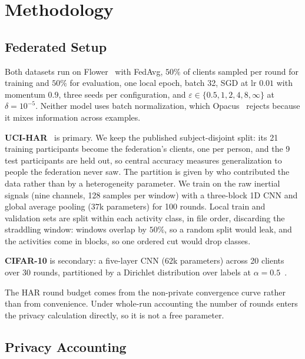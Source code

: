 \section{Methodology}

\subsection{Federated Setup}

Both datasets run on Flower~\cite{beutel2020flower} with FedAvg, $50\%$ of clients
sampled per round for training and $50\%$ for evaluation, one local epoch,
batch 32, SGD at lr $0.01$ with momentum $0.9$, three seeds per
configuration, and $\varepsilon \in \{0.5, 1, 2, 4, 8, \infty\}$ at
$\delta = 10^{-5}$. Neither model uses batch normalization, which
Opacus~\cite{yousefpour2021opacus} rejects because it mixes information across examples.

\textbf{UCI-HAR}~\cite{anguita2013public} is primary. We keep the published
subject-disjoint split: its 21 training participants become the federation's
clients, one per person, and the 9 test participants are held out, so central
accuracy measures generalization to people the federation never saw. The
partition is given by who contributed the data rather than by a heterogeneity
parameter. We train on the raw inertial signals (nine channels, 128 samples
per window) with a three-block 1D CNN and global average pooling ($37$k
parameters) for 100 rounds. Local train and validation sets are split
within each activity class, in file order, discarding the straddling window:
windows overlap by $50\%$, so a random split would leak, and the activities
come in blocks, so one ordered cut would drop classes.

\textbf{CIFAR-10} is secondary: a five-layer CNN ($62$k parameters) across 20
clients over 30 rounds, partitioned by a Dirichlet distribution over labels at
$\alpha = 0.5$~\cite{hsu2019measuring}.

The HAR round budget comes from the non-private convergence curve rather than
from convenience. Under whole-run accounting the number of rounds enters the
privacy calculation directly, so it is not a free parameter.

\subsection{Privacy Accounting}
\label{sec:accounting}

